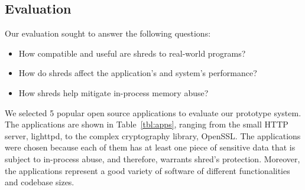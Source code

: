 \newcommand{\numopensource}{5\xspace}
\subsection{Evaluation}
\label{shreds:sec:eval}

Our evaluation sought to answer the following questions: 
\begin{itemize}
\item How compatible and useful are shreds to real-world programs?
\item How do shreds affect the application's and system's performance?
\item How shreds help mitigate in-process memory abuse?
\end{itemize}

We selected 5 popular open source applications to evaluate our prototype system.  The applications are shown in Table~\ref{tbl:apps}, ranging from the small HTTP server, lighttpd, to the complex cryptography library, OpenSSL. 
The applications were chosen because each of them has at least one piece of sensitive data that is subject to in-process abuse, and therefore, warrants shred's protection. Moreover, the applications represent a good variety of software of different functionalities and codebase sizes. 


